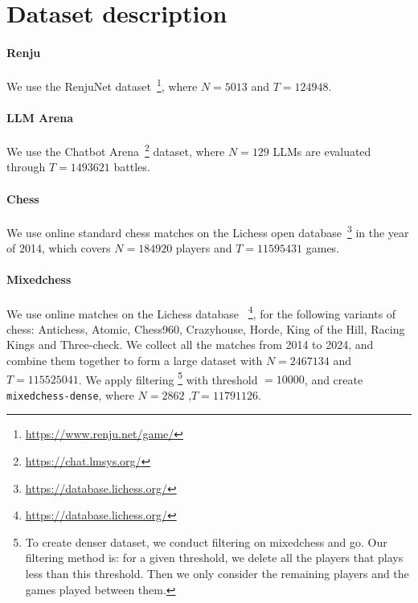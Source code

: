 \section{Dataset description}
\label{sec:appendix-dataset}
\paragraph{Renju} We use the RenjuNet dataset~\footnote{\url{https://www.renju.net/game/}}, where $N=5013$ and $T=124948$.
\paragraph{LLM Arena} We use the Chatbot Arena~\footnote{\url{https://chat.lmsys.org/}} dataset, where $N=129$ LLMs are evaluated through $T=1493621$ battles.
\paragraph{Chess} We use online standard chess matches on the Lichess open database~\footnote{\url{https://database.lichess.org/}} in the year of 2014, which covers $N=184920$ players and $T=11595431$ games.

\paragraph{Mixedchess} We use online matches on the Lichess database ~\footnote{\url{https://database.lichess.org/}}, for the following variants of chess: Antichess, Atomic, Chess960, Crazyhouse, Horde, King of the Hill, Racing Kings and Three-check. We collect all the matches from 2014 to 2024, and combine them together to form a large dataset with $N=2467134$ and $T=115525041$. We apply filtering \footnote{To create denser dataset, we conduct filtering on mixedchess and go. Our filtering method is: for a given threshold, we delete all the players that plays less than this threshold. Then we only consider the remaining players and the games played between them.} with threshold  $= 10000$, and create \texttt{mixedchess-dense}, where $N= 2862$ ,$T= 11791126$.

